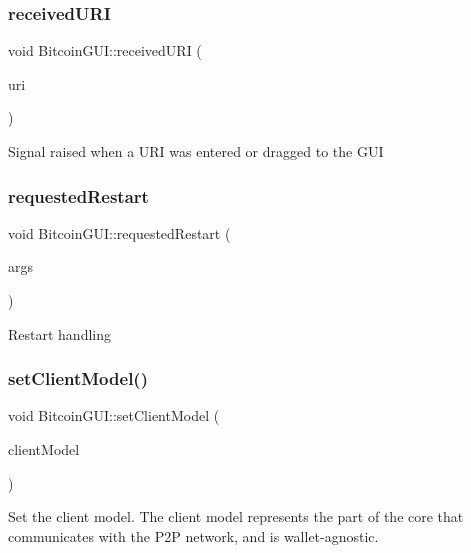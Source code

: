 \subsubsection{\texorpdfstring{received\+U\+RI}{receivedURI}}
{\footnotesize\ttfamily void Bitcoin\+G\+U\+I\+::received\+U\+RI (\begin{DoxyParamCaption}\item[{const Q\+String \&}]{uri }\end{DoxyParamCaption})\hspace{0.3cm}{\ttfamily [signal]}}

Signal raised when a U\+RI was entered or dragged to the G\+UI \mbox{\label{class_bitcoin_g_u_i_aa16b27ff0eab480255ba86b7d0486034}} 
\subsubsection{\texorpdfstring{requested\+Restart}{requestedRestart}}
{\footnotesize\ttfamily void Bitcoin\+G\+U\+I\+::requested\+Restart (\begin{DoxyParamCaption}\item[{Q\+String\+List}]{args }\end{DoxyParamCaption})\hspace{0.3cm}{\ttfamily [signal]}}

Restart handling \mbox{\label{class_bitcoin_g_u_i_a99d71e1f8478ab937ce2522c8d3815e3}} 
\subsubsection{\texorpdfstring{set\+Client\+Model()}{setClientModel()}}
{\footnotesize\ttfamily void Bitcoin\+G\+U\+I\+::set\+Client\+Model (\begin{DoxyParamCaption}\item[{\mbox{\hyperlink{class_client_model}{Client\+Model}} $\ast$}]{client\+Model }\end{DoxyParamCaption})}

Set the client model. The client model represents the part of the core that communicates with the P2P network, and is wallet-\/agnostic. \mbox{\label{class_bitcoin_g_u_i_ad9c5016f37aa52562c114527a63a2563}} 
